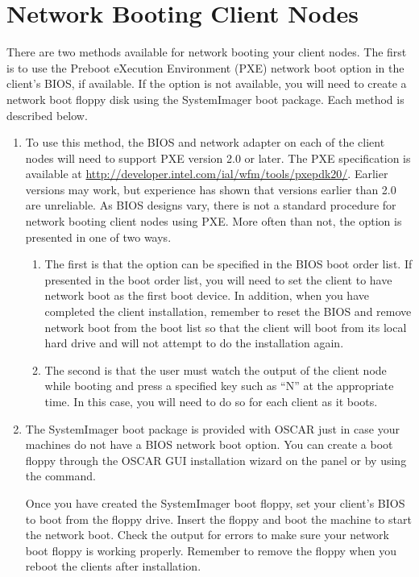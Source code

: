 %
%
%

\section{Network Booting Client Nodes}
\label{app:net-boot-client-nodes}

There are two methods available for network booting your client nodes.
The first is to use the Preboot eXecution Environment (PXE) network
boot option in the client's BIOS, if available. If the option is not
available, you will need to create a network boot floppy disk using
the SystemImager boot package. Each method is described below.

\begin{enumerate}
\item {} To use this method, the BIOS
  and network adapter on each of the client nodes will need to support
  PXE version 2.0 or later. The PXE specification is available at
  \url{http://developer.intel.com/ial/wfm/tools/pxepdk20/}.  Earlier
  versions may work, but experience has shown that versions earlier
  than 2.0 are unreliable. As BIOS designs vary, there is not a
  standard procedure for network booting client nodes using PXE.  More
  often than not, the option is presented in one of two ways.

  \begin{enumerate}
  \item The first is that the option can be specified in the BIOS boot
    order list. If presented in the boot order list, you will need to
    set the client to have network boot as the first boot device. In
    addition, when you have completed the client installation,
    remember to reset the BIOS and remove network boot from the boot
    list so that the client will boot from its local hard drive and
    will not attempt to do the installation again.
    
  \item The second is that the user must watch the output of the
    client node while booting and press a specified key such as ``N''
    at the appropriate time. In this case, you will need to do so for
    each client as it boots.
  \end{enumerate}
  
\item {} The
  SystemImager boot package is provided with OSCAR just in case your
  machines do not have a BIOS network boot option.  You can create a
  boot floppy through the OSCAR GUI installation wizard on the
   panel or by using the
   command.
  
  Once you have created the SystemImager boot floppy, set your
  client's BIOS to boot from the floppy drive. Insert the floppy and
  boot the machine to start the network boot. Check the output for
  errors to make sure your network boot floppy is working properly.
  Remember to remove the floppy when you reboot the clients after
  installation.
\end{enumerate}

